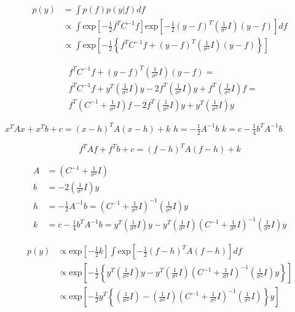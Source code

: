 \documentclass[10pt]{article}
\begin{document}
\begin{enumerate}[label=(\Alph*)]
            \begin{align*}
                p(y) &= \int p(f) p(y|f) df \\
                & \propto \int \text{exp}\left[- \frac{1}{2} f^T C^{-1} f \right] \text{exp} \left[- \frac{1}{2} (y-f)^T \left(\frac{1}{\sigma^2} I \right) (y-f)\right] df\\
                & \propto \int \text{exp}\left[-\frac{1}{2} \left\{ f^T C^{-1}f + (y-f)^T \left(\frac{1}{\sigma^2} I \right) (y-f)\right\} \right]
            \end{align*}

            \begin{align*}
                & f^T C^{-1}f + (y-f)^T \left(\frac{1}{\sigma^2} I \right) (y-f) = \\
                & f^T C^{-1}f + y^T \left(\frac{1}{\sigma^2} I \right) y - 2 f^T \left(\frac{1}{\sigma^2} I \right) y + f^T \left(\frac{1}{\sigma^2} I \right) f = \\
                & f^T \left(C^{-1} + \frac{1}{\sigma^2} I \right) f - 2 f^T \left(\frac{1}{\sigma^2} I \right) y + y^T \left(\frac{1}{\sigma^2} I \right) y
            \end{align*}

            $x^T A x + x^T b + c = (x-h)^T A (x-h) + k$ $h = -\frac{1}{2} A^{-1} b$ $k=c - \frac{1}{4} b^T A^{-1} b$

            $$f^T A f + f^T b + c = (f - h)^T A (f-h) + k$$

            \begin{align*}
                A &= \left(C^{-1} + \frac{1}{\sigma^2} I \right) \\
                b &= -2 \left(\frac{1}{\sigma^2} I \right) y\\
                h &= -\frac{1}{2}A^{-1}b = \left(C^{-1} + \frac{1}{\sigma^2} I \right)^{-1} \left(\frac{1}{\sigma^2} I \right) y \\
                k &= c - \frac{1}{4} b^T A^{-1} b = y^T \left(\frac{1}{\sigma^2} I \right) y - y^T \left(\frac{1}{\sigma^2} I \right) \left(C^{-1} + \frac{1}{\sigma^2} I \right)^{-1} \left(\frac{1}{\sigma^2} I \right) y
            \end{align*}

            \begin{align*}
                p(y) & \propto \text{exp} \left[-\frac{1}{2} k \right] \int \text{exp}\left[ -\frac{1}{2} (f-h)^T A (f-h) \right] df \\
                & \propto \text{exp} \left[-\frac{1}{2} \left\{ y^T \left(\frac{1}{\sigma^2} I \right) y - y^T \left(\frac{1}{\sigma^2} I \right) \left(C^{-1} + \frac{1}{\sigma^2} I \right)^{-1} \left(\frac{1}{\sigma^2} I \right) y \right\} \right] \\
                & \propto \text{exp} \left[-\frac{1}{2} y^T \left \{ \left(\frac{1}{\sigma^2} I \right) - \left(\frac{1}{\sigma^2} I \right) \left(C^{-1} + \frac{1}{\sigma^2} I \right)^{-1} \left(\frac{1}{\sigma^2} I \right) \right\} y \right]
            \end{align*}


\end{enumerate}
\end{document}
